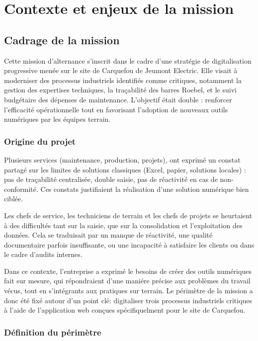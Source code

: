 \documentclass[11pt,a4paper]{article}
\begin{document}
\newpage
\section{Contexte et enjeux de la mission}
\subsection{Cadrage de la mission}

Cette mission d'alternance s’inscrit dans le cadre d’une stratégie de digitalisation progressive menée sur le site de Carquefou de Jeumont Electric. Elle visait à moderniser des processus industriels identifiés comme critiques, notamment la gestion des expertises techniques, la traçabilité des barres Roebel, et le suivi budgétaire des dépenses de maintenance. L’objectif était double : renforcer l’efficacité opérationnelle tout en favorisant l’adoption de nouveaux outils numériques par les équipes terrain.

\subsubsection{Origine du projet}

Plusieurs services (maintenance, production, projets), ont exprimé un constat partagé sur les limites de solutions classiques (Excel, papier, solutions locales) : pas de traçabilité centralisée, double saisie, pas de réactivité en cas de non-conformité. Ces constats justifiaient la réalisation d’une solution numérique bien ciblée.

Les chefs de service, les techniciens de terrain et les chefs de projets se heurtaient à des difficultés tant sur la saisie, que sur la consolidation et l’exploitation des données. Cela se traduisait par un manque de réactivité, une qualité documentaire parfois insuffisante, ou une incapacité à satisfaire les clients ou dans le cadre d’audits internes.

Dans ce contexte, l'entreprise a exprimé le besoins de créer des outils numériques  fait sur mesure, qui répondraient d'une maniére précise aux problèmes du travail vécus, tout en s'intégrants aux pratiques sur terrain. Le périmètre de la mission a donc été fixé autour d'un point clé: digitaliser trois processus industriels critiques à l'aide de l'application web conçues spécifiquelment pour le site de Carquefou.

\subsubsection{Définition du périmètre}
\end{document}
